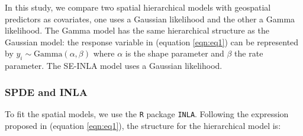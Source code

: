 \documentclass{article}
\begin{document}



In this study, we compare two spatial hierarchical  models with geospatial predictors as covariates, one uses a Gaussian likelihood and the other a Gamma likelihood. The Gamma model has the same hierarchical structure as the Gaussian model: the response variable in (equation \ref{eqn:eq1}) can be represented by $y_{i} \sim \text{Gamma}(\alpha, \beta)$ where $\alpha$ is the shape parameter and $\beta$ the rate parameter. The SE-INLA model uses a Gaussian likelihood.

\subsubsection{SPDE and INLA}

To fit the  spatial models, we use the \texttt{R} package \texttt{INLA}. Following the expression proposed in (equation \ref{eqn:eq1}), the structure for the hierarchical model is: %

\end{document}
